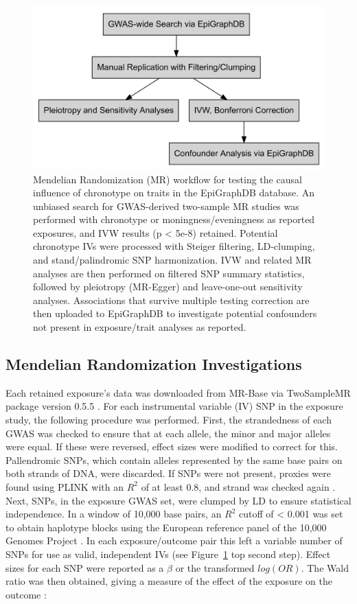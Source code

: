 \documentclass[journal,article,submit,moreauthors,pdftex]{Definitions/mdpi}
\begin{document}
\begin{figure}[htbp]
	\centering
	\includegraphics[width=0.9\linewidth]{Figs/Analysis1/outline.png}
	\caption{Mendelian Randomization (MR) workflow for testing the causal influence of chronotype on traits in the EpiGraphDB database. An unbiased search for GWAS-derived two-sample MR studies was performed with chronotype or moningness/eveningness as reported exposures, and IVW results (p < 5e-8) retained. Potential chronotype IVs were processed with Steiger filtering, LD-clumping, and stand/palindromic SNP harmonization. IVW and related MR analyses are then performed on filtered SNP summary statistics, followed by pleiotropy (MR-Egger) and leave-one-out sensitivity analyses. Associations that survive multiple testing correction are then uploaded to EpiGraphDB to investigate potential confounders not present in exposure/trait analyses as reported.}
	\label{fig:MR_Workflow}
\end{figure}

\subsection{Mendelian Randomization Investigations}

Each retained exposure's data was downloaded from MR-Base via TwoSampleMR package version 0.5.5 \cite{hemani_mr-base_2018}. For each instrumental variable (IV) SNP in the exposure study, the following procedure was performed. First, the strandedness of each GWAS was checked to ensure that at each allele, the minor and major alleles were equal. If these were reversed, effect sizes were modified to correct for this. Pallendromic SNPs, which contain alleles represented by the same base pairs on both strands of DNA, were discarded. If SNPs were not present, proxies were found using PLINK with an $R^2$ of at least 0.8, and strand was checked again \cite{chang_second-generation_2015}. Next, SNPs, in the exposure GWAS set, were clumped by LD to ensure statistical independence. In a window of 10,000 base pairs, an $R^2$ cutoff of < 0.001 was set to obtain haplotype blocks using the European reference panel of the 10,000 Genomes Project \cite{huang_improved_2015}. In each exposure/outcome pair this left a variable number of SNPs for use as valid, independent IVs (see Figure~\ref{fig:MR_Workflow} top second step). Effect sizes for each SNP were reported as a $\beta$ or the transformed $log(OR)$. The Wald ratio was then obtained, giving a measure of the effect of the exposure on the outcome \cite{rasooly_conducting_2019}: 
\end{document}
